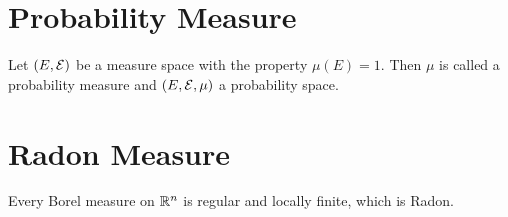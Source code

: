 \section{Probability Measure}

\begin{definition}
    Let $(E,\mathcal{E})$ be a measure space with the property $\mu(E)=1$.
    Then $\mu$ is called a probability measure and $(E,\mathcal{E},\mu)$ a probability space.
\end{definition}

\section{Radon Measure}

Every Borel measure on $\mathbb{R}^n$ is regular and locally finite, which is Radon.